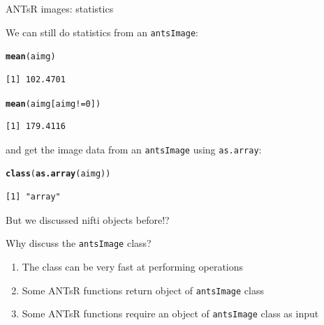 \documentclass[11pt]{beamer}\usepackage[]{graphicx}\usepackage[]{color}
\makeatletter
\newcommand{\hlnum}[1]{\textcolor[rgb]{0.686,0.059,0.569}{#1}}%
\newcommand{\hlopt}[1]{\textcolor[rgb]{0,0,0}{#1}}%
\newcommand{\hlstd}[1]{\textcolor[rgb]{0.345,0.345,0.345}{#1}}%
\newcommand{\hlkwd}[1]{\textcolor[rgb]{0.737,0.353,0.396}{\textbf{#1}}}%
\newenvironment{kframe}{%
 \def\at@end@of@kframe{}%
 \ifinner\ifhmode%
  \def\at@end@of@kframe{\end{minipage}}%
  \begin{minipage}{\columnwidth}%
 \fi\fi%
 \def\FrameCommand##1{\hskip\@totalleftmargin \hskip-\fboxsep
 \colorbox{shadecolor}{##1}\hskip-\fboxsep
     \hskip-\linewidth \hskip-\@totalleftmargin \hskip\columnwidth}%
 \MakeFramed {\advance\hsize-\width
   \@totalleftmargin\z@ \linewidth\hsize
   \@setminipage}}%
 {\par\unskip\endMakeFramed%
 \at@end@of@kframe}
\newenvironment{knitrout}{}{} %
\makeatother
\begin{document}
\begin{frame}[fragile]{ANTsR images: statistics}

We can still do statistics from an \verb|antsImage|:
\begin{knitrout}
\color{fgcolor}\begin{kframe}
\begin{alltt}
\hlkwd{mean}\hlstd{(aimg)}
\end{alltt}
\begin{verbatim}
[1] 102.4701
\end{verbatim}
\begin{alltt}
\hlkwd{mean}\hlstd{(aimg[aimg}\hlopt{!=}\hlnum{0}\hlstd{])}
\end{alltt}
\begin{verbatim}
[1] 179.4116
\end{verbatim}
\end{kframe}
\end{knitrout}
and get the image data from an \verb|antsImage| using \verb|as.array|:

\begin{knitrout}
\color{fgcolor}\begin{kframe}
\begin{alltt}
\hlkwd{class}\hlstd{(}\hlkwd{as.array}\hlstd{(aimg))}
\end{alltt}
\begin{verbatim}
[1] "array"
\end{verbatim}
\end{kframe}
\end{knitrout}

\end{frame}

\begin{frame}[fragile]{But we discussed nifti objects before!?}

Why discuss the \verb|antsImage| class?

\begin{enumerate}
\item The class can be very fast at performing operations
\item Some ANTsR functions return object of \verb|antsImage| class
\item Some ANTsR functions require an object of \verb|antsImage| class as input
\end{enumerate}

\end{frame}
\end{document}

